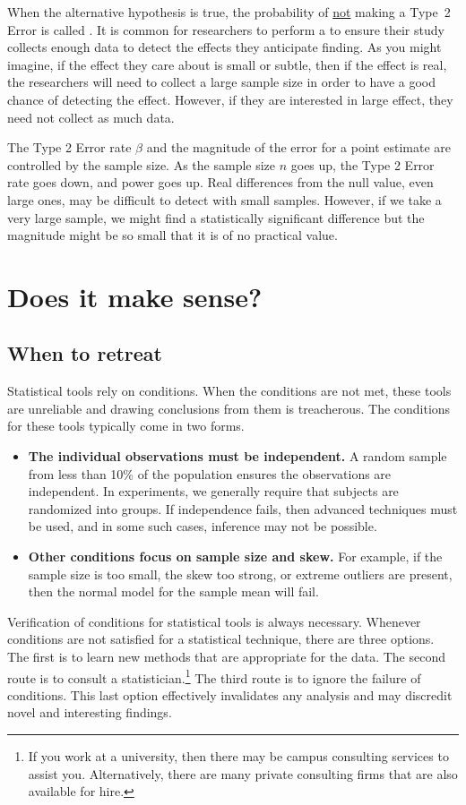 When the alternative hypothesis is true, the probability of \underline{not} making a Type~2 Error is called . It is common for researchers to perform a  to ensure their study collects enough data to detect the effects they anticipate finding. As you might imagine, if the effect they care about is small or subtle, then if the effect is real, the researchers will need to collect a large sample size in order to have a good chance of detecting the effect. However, if they are interested in large effect, they need not collect as much data.

The Type 2 Error rate $\beta$ and the magnitude of the error for a point estimate are controlled by the sample size. As the sample size $n$ goes up, the Type 2 Error rate goes down, and power goes up. Real differences from the null value, even large ones, may be difficult to detect with small samples. However, if we take a very large sample, we might find a statistically significant difference but the magnitude might be so small that it is of no practical value.




\section{Does it make sense?}
\subsection{When to retreat}
\label{whenToRetreat}

Statistical tools rely on conditions. When the conditions are not met, these tools are unreliable and drawing conclusions from them is treacherous. The conditions for these tools typically come in two forms.
\begin{itemize}
\setlength{\itemsep}{0mm}
\item \textbf{The individual observations must be independent.} A random sample from less than 10\% of the population ensures the observations are independent. In experiments, we generally require that subjects are randomized into groups. If independence fails, then advanced techniques must be used, and in some such cases, inference may not be possible.
\item \textbf{Other conditions focus on sample size and skew.} For example, if the sample size is too small, the skew too strong, or extreme outliers are present, then the normal model for the sample mean will fail.
\end{itemize}
Verification of conditions for statistical tools is always necessary. Whenever conditions are not satisfied for a statistical technique, there are three options. The first is to learn new methods that are appropriate for the data. The second route is to consult a statistician.\footnote{If you work at a university, then there may be campus consulting services to assist you. Alternatively, there are many private consulting firms that are also available for hire.} The third route is to ignore the failure of conditions. This last option effectively invalidates any analysis and may discredit novel and interesting findings.


